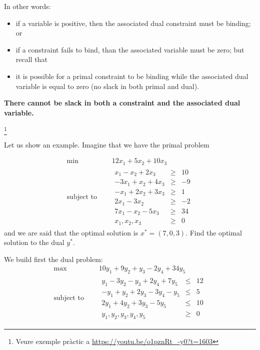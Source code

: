   In other words: 
  \begin{itemize}
    \item if a variable is positive, then the associated dual constraint must be binding; or
    \item if a constraint fails to bind, than the associated variable must be zero; but recall that
    \item it is possible for a primal constraint to be binding while the associated dual variable is equal to zero (no slack in both primal and dual).
  \end{itemize}
  {\bf There cannot be slack in both a constraint and the associated dual variable.}
 
 
  
\footnote{Veure exemple pràctic a \url{https://youtu.be/o1pznRt_-y0?t=1603}}


  Let us show an example. Imagine that we have the primal problem

  \begin{equation*}
    \begin{aligned}
      \text{min } \quad & 12x_1+5x_2+10x_3 \\
      \text{subject to }\quad &
      \begin{array}{rcl}
        x_1-x_2+2x_3 &\geq &10 \\
        -3x_1+x_2+4x_3 &\geq &-9 \\
        -x_1+2x_2+3x_3 &\geq &1 \\
        2x_1-3x_2 &\geq &-2 \\
        7x_1-x_2-5x_3 &\geq &34 \\
        x_1,x_2,x_3 &\geq& 0
      \end{array}
    \end{aligned}
  \end{equation*}
  and we are said that the optimal solution is $x^*=(7,0,3)$. Find the optimal solution to the dual $y^*$.


  We build first the dual problem:
  \begin{equation}
    \begin{aligned}
      \text{max } \quad & 10y_1+9y_2+y_3-2y_4+34y_5 \\
      \text{subject to }\quad &
      \begin{array}{rcl}
        y_1-3y_2-y_3+2y_4+7y_5 &\leq &12 \\
        -y_1+y_2+2y_3-3y_4-y_5&\leq&5\\
        2y_1+4y_2+3y_3-5y_5&\leq&10\\
        y_1,y_2,y_3,y_4,y_5 &\geq& 0
      \end{array}
    \end{aligned}
    \label{eq:dual}
  \end{equation}


